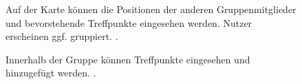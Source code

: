\documentclass[parskip=full,11pt]{scrartcl}
\begin{document}
\begin{figure}[hb]
		\caption{\label{fig:map}
			Auf der Karte können die Positionen der anderen Gruppenmitglieder und bevorstehende
			Treffpunkte eingesehen werden. Nutzer erscheinen ggf. gruppiert.
			.
		}
\end{figure}

\begin{figure}[hb]
		\caption{\label{fig:map}
			Innerhalb der Gruppe können Treffpunkte eingesehen und hinzugefügt werden.
			.
		}
\end{figure}
\end{document}
